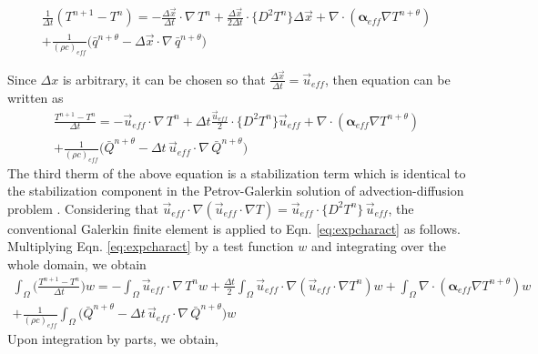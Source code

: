 \\
\\
\begin{equation}
\begin{split}
\frac{1}{\Delta t}(T^{n+1}-T^n)=-\frac{\Delta \vec{x}}{\Delta t}\cdot  \nabla\,T^n+\frac{\Delta\vec{x}}{2 \Delta t}\cdot\{D^2T^n\}\Delta\vec{x}	
+\nabla\cdot(\mathbf{\alpha}_{eff}\nabla T^{n+\theta})\\
+\frac{1}{(\rho c )_{eff}}\big(\bar{q}^{n+\theta}- \Delta \vec{x}\cdot  \nabla\,\bar{q}^{n+\theta}\big)
\end{split}
\end{equation}

Since $\Delta x$ is arbitrary, it can be chosen so that $\frac{\Delta \vec{x}}{\Delta t}=\vec{u}_{eff}$, then equation can be written as
\begin{equation}	\label{eq:expcharact}
\begin{split}
\frac{T^{n+1}-T^n}{\Delta t}=-\vec{u}_{eff}\cdot \nabla\,T^n+\Delta t\frac{\vec{u}_{eff}}{2 }\cdot\{D^2T^n\}\vec{u}_{eff}	
+\nabla\cdot(\mathbf{\alpha}_{eff}\nabla T^{n+\theta})\\
+\frac{1}{(\rho c )_{eff}}\big(\bar{Q}^{n+\theta}- \Delta t\, \vec{u}_{eff}\cdot  \nabla\,\bar{Q}^{n+\theta}\big)
\end{split}
\end{equation}
The third therm of the above equation is a stabilization term which is identical to the stabilization component in the Petrov-Galerkin solution of advection-diffusion problem .
Considering that $\vec{u}_{eff}\cdot\nabla(\vec{u}_{eff}\cdot\nabla T)=\vec{u}_{eff}\cdot\{D^2T^n\}\,\vec{u}_{eff}$, the conventional Galerkin finite element is applied to Eqn. \ref{eq:expcharact} as follows. Multiplying Eqn. \ref{eq:expcharact} by a test function $w$ and integrating over the whole domain, we obtain
\begin{equation}
\begin{split}
\int_{\Omega}\Big(\frac{T^{n+1}-T^n}{\Delta t}\Big)w=-\int_{\Omega}\vec{u}_{eff}\cdot \nabla\,T^nw+\frac{\Delta t}{2}\int_{\Omega}\vec{u}_{eff}\cdot\nabla(\vec{u}_{eff}\cdot\nabla T^n)w	
+\int_{\Omega}\nabla\cdot(\mathbf{\alpha}_{eff}\nabla T^{n+\theta})w\\
+\frac{1}{(\rho c )_{eff}}\int_{\Omega}\big(\bar{Q}^{n+\theta}- \Delta t\, \vec{u}_{eff}\cdot  \nabla\,\bar{Q}^{n+\theta}\big)w
\end{split}
\end{equation}
Upon integration by parts, we obtain,
